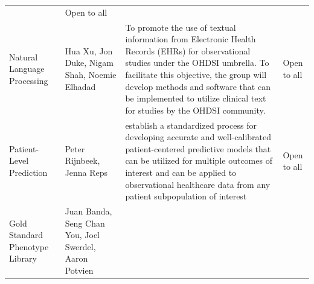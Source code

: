 \documentclass[11pt]{book}
\theoremstyle{definition}
\theoremstyle{definition}
\theoremstyle{definition}
\theoremstyle{remark}
\begin{document}
\begin{longtable}[]{@{}llll@{}}
\begin{minipage}[t]{0.22\columnwidth}
\end{minipage} & \begin{minipage}[t]{0.22\columnwidth}\raggedright
Open to all\strut
\end{minipage}\tabularnewline
\begin{minipage}[t]{0.22\columnwidth}\raggedright
Natural Language Processing\strut
\end{minipage} & \begin{minipage}[t]{0.22\columnwidth}\raggedright
Hua Xu, Jon Duke, Nigam Shah, Noemie Elhadad\strut
\end{minipage} & \begin{minipage}[t]{0.22\columnwidth}\raggedright
To promote the use of textual information from Electronic Health Records (EHRs) for observational studies under the OHDSI umbrella. To facilitate this objective, the group will develop methods and software that can be implemented to utilize clinical text for studies by the OHDSI community.\strut
\end{minipage} & \begin{minipage}[t]{0.22\columnwidth}\raggedright
Open to all\strut
\end{minipage}\tabularnewline
\begin{minipage}[t]{0.22\columnwidth}\raggedright
Patient-Level Prediction\strut
\end{minipage} & \begin{minipage}[t]{0.22\columnwidth}\raggedright
Peter Rijnbeek, Jenna Reps\strut
\end{minipage} & \begin{minipage}[t]{0.22\columnwidth}\raggedright
establish a standardized process for developing accurate and well-calibrated patient-centered predictive models that can be utilized for multiple outcomes of interest and can be applied to observational healthcare data from any patient subpopulation of interest\strut
\end{minipage} & \begin{minipage}[t]{0.22\columnwidth}\raggedright
Open to all\strut
\end{minipage}\tabularnewline
\begin{minipage}[t]{0.22\columnwidth}\raggedright
Gold Standard Phenotype Library\strut
\end{minipage} & \begin{minipage}[t]{0.22\columnwidth}\raggedright
Juan Banda, Seng Chan You, Joel Swerdel, Aaron Potvien\strut
\end{minipage} & \begin{minipage}[t]{0.22\columnwidth}\raggedright

\end{minipage}
\end{longtable}
\end{document}
